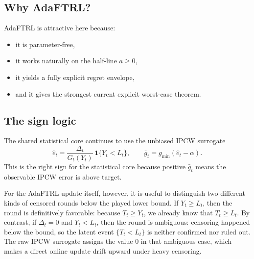 \documentclass[11pt]{article}
\newcommand{\1}{\mathbf{1}}
\begin{document}
\subsection{Why AdaFTRL?}

AdaFTRL is attractive here because:
\begin{itemize}[leftmargin=*,itemsep=2pt]
  \item it is parameter-free,
  \item it works naturally on the half-line \(a\ge 0\),
  \item it yields a fully explicit regret envelope,
  \item and it gives the strongest current explicit worst-case theorem.
\end{itemize}

\subsection{The sign logic}

The shared statistical core continues to use the unbiased IPCW surrogate
\[
\hat e_t=\frac{\Delta_t}{G_t(Y_t)}\,\1\{Y_t<L_t\},
\qquad
\bar g_t=g_{\min}(\hat e_t-\alpha).
\]
This is the right sign for the statistical core because positive \(\bar g_t\) means the observable IPCW error is above target.

For the AdaFTRL update itself, however, it is useful to distinguish two different kinds of censored rounds below the played lower bound. If \(Y_t\ge L_t\), then the round is definitively favorable: because \(T_t\ge Y_t\), we already know that \(T_t\ge L_t\). By contrast, if \(\Delta_t=0\) and \(Y_t<L_t\), then the round is ambiguous: censoring happened below the bound, so the latent event \(\{T_t<L_t\}\) is neither confirmed nor ruled out. The raw IPCW surrogate assigns the value \(0\) in that ambiguous case, which makes a direct online update drift upward under heavy censoring.
\end{document}
